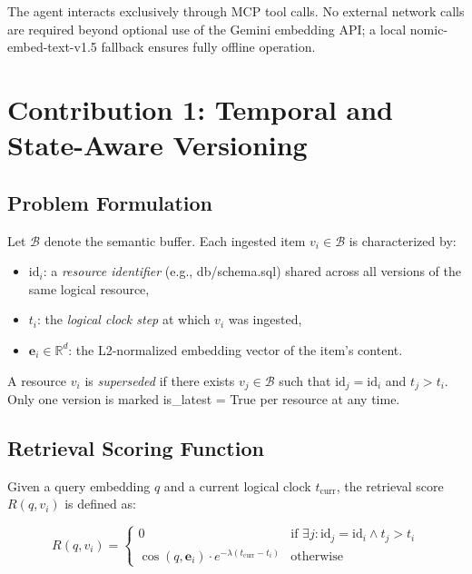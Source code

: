 \documentclass[lettersize,journal]{IEEEtran}
\begin{document}
The agent interacts exclusively through MCP tool calls. No external network calls are required beyond optional use of the Gemini embedding API; a local nomic-embed-text-v1.5 fallback ensures fully offline operation.

\section{Contribution 1: Temporal and State-Aware Versioning}

\subsection{Problem Formulation}

Let $\mathcal{B}$ denote the semantic buffer. Each ingested item $v_i \in \mathcal{B}$ is characterized by:
\begin{itemize}
    \item $\text{id}_i$: a \emph{resource identifier} (e.g., db/schema.sql) shared across all versions of the same logical resource,
    \item $t_i$: the \emph{logical clock step} at which $v_i$ was ingested,
    \item $\mathbf{e}_i \in \mathbb{R}^d$: the L2-normalized embedding vector of the item's content.
\end{itemize}

A resource $v_i$ is \emph{superseded} if there exists $v_j \in \mathcal{B}$ such that $\text{id}_j = \text{id}_i$ and $t_j > t_i$. Only one version is marked is\_latest = True per resource at any time.

\subsection{Retrieval Scoring Function}

Given a query embedding $q$ and a current logical clock $t_{\text{curr}}$, the retrieval score $R(q, v_i)$ is defined as:

\begin{equation}
\label{eq:matp_score}
R(q, v_i) = \begin{cases}
0 & \text{if } \exists j : \text{id}_j = \text{id}_i \wedge t_j > t_i \\
\cos(q, \mathbf{e}_i) \cdot e^{-\lambda(t_{\text{curr}} - t_i)} & \text{otherwise}
\end{cases}
\end{equation}
\end{document}
